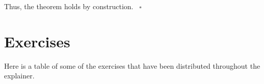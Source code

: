 \documentclass{article}
\theoremstyle{plain}
\theoremstyle{definition}
\begin{document}
Thus, the theorem holds by construction.  ~\ensuremath{\square}







  

    

  

   

    



 



   

    



     



    

 

 

   

 



 



     



  





 



  



\section{Exercises}


Here is a table of some of the exercises that have been distributed throughout the explainer.

\tableofcontents




\printbibliography
 
\end{document}
